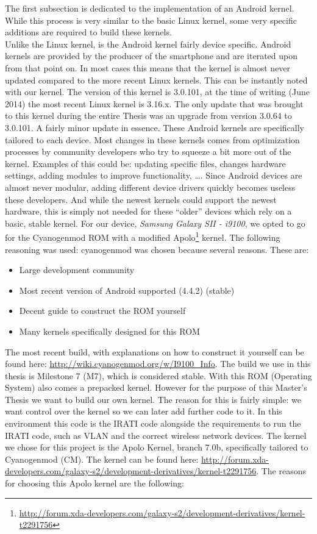The first subsection is dedicated to the implementation of an Android kernel. While this process is very similar to the basic Linux kernel, some very specific additions are required to build these kernels. 
\\
Unlike the Linux kernel, is the Android kernel fairly device specific. Android kernels are provided by the producer of the smartphone and are iterated upon from that point on. In most cases this means that the kernel is almost never updated compared to the more recent Linux kernels. This can be instantly noted with our kernel. The version of this kernel is 3.0.101, at the time of writing (June 2014) the most recent Linux kernel is 3.16.x. The only update that was brought to this kernel during the entire Thesis was an upgrade from version 3.0.64 to 3.0.101. A fairly minor update in essence. These Android kernels are specifically tailored to each device. Most changes in these kernels comes from optimization processes by community developers who try to squeeze a bit more out of the kernel. Examples of this could be: updating specific files, changes hardware settings, adding modules to improve functionality, \ldots. Since Android devices are almost never modular, adding different device drivers quickly becomes useless these developers. And while the newest kernels could support the newest hardware, this is simply not needed for these ``older'' devices which rely on a basic, stable kernel. 
\npar
For our device, \emph{Samsung Galaxy SII - i9100}, we opted to go for the Cyanogenmod ROM with a modified Apolo\footnote{\url{http://forum.xda-developers.com/galaxy-s2/development-derivatives/kernel-t2291756}} kernel. The following reasoning was used: cyanogenmod was chosen because several reasons. These are:

\begin{itemize}
	\item Large development community
	\item Most recent version of Android supported (4.4.2) (stable)
	\item Decent guide to construct the ROM yourself
	\item Many kernels specifically designed for this ROM
\end{itemize}

The most recent build, with explanations on how to construct it yourself can be found here: \url{http://wiki.cyanogenmod.org/w/I9100\_Info}. The build we use in this thesis is Milestone 7 (M7), which is considered stable. With this ROM (Operating System) also comes a prepacked kernel. However for the purpose of this Master's Thesis we want to build our own kernel. The reason for this is fairly simple: we want control over the kernel so we can later add further code to it. In this environment this code is the IRATI code alongside the requirements to run the IRATI code, such as VLAN and the correct wireless network devices. 
\npar
The kernel we chose for this project is the Apolo Kernel, branch 7.0b, specifically tailored to Cyanogenmod (CM). The kernel can be found here: \url{http://forum.xda-developers.com/galaxy-s2/development-derivatives/kernel-t2291756}. The reasons for choosing this Apolo kernel are the following:

